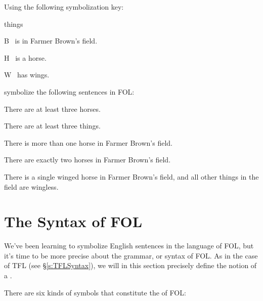 \problempart Using the following symbolization key:
\begin{ekey}
\item[\text{domain}] things
\item[B] \blank\  is in Farmer Brown's field.
\item[H] \blank\  is a horse.
\item[W] \blank\  has wings.
\end{ekey}
symbolize the following sentences in FOL:
\begin{earg}
\item There are at least three horses.
\item There are at least three things.
\item There is more than one horse in Farmer Brown's field.
\item There are exactly two horses in Farmer Brown's field.
\item There is a single winged horse in Farmer Brown's field, and all other things in the field are wingless.
\end{earg}



\section{The Syntax of FOL}\label{s:FOLSyntax}

We've been learning to symbolize English sentences in the language of FOL, but it's time to be more precise about the grammar, or syntax of FOL.  As in the case of TFL (see \S\ref{s:TFLSyntax}), we will in this section precisely define the notion of a  .

There are six kinds of symbols that constitute the  of FOL:

